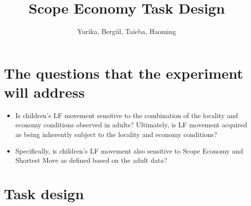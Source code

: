 \documentclass[11pt]{article}
\title{Scope Economy Task Design}
\author{Yurika, Berg\"ul, Taieba, Haoming}
\begin{document}
\maketitle
\section{The questions that the experiment will address}
\label{sec:the_questions_that_the_experiment_will_address}


\begin{itemize}
  \item Is children's LF movement sensitive to the combination of the locality
    and economy conditions observed in adults? Ultimately, is LF movement
    acquired as being inherently subject to the locality and economy
    conditions?
  \item Specifically, is children's LF movement also sensitive to Scope
    Economy and Shortest Move as defined based on the adult data?
\end{itemize}

\section{Task design}
\label{sec:task_design}
\end{document}
